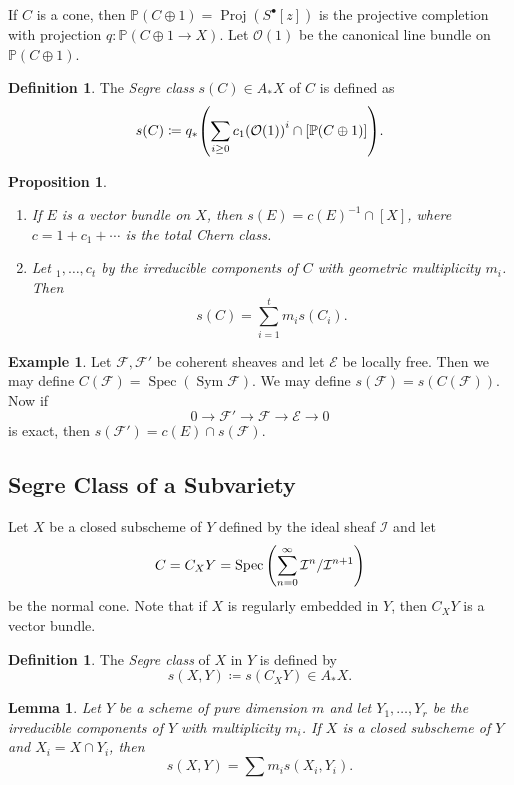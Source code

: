 \documentclass[leqno, openany]{memoir}
\newtheorem{prop}[thm]{Proposition}
\newtheorem{lem}[thm]{Lemma}
\theoremstyle{definition}
\newtheorem{defn}[thm]{Definition}
\newtheorem{exm}[thm]{Example}
\theoremstyle{remark}
\theoremstyle{plain}
\theoremstyle{definition}
\theoremstyle{remark}
\renewcommand{\P}{\mathbb{P}}
\newcommand{\mc}[1]{\mathcal{#1}}
\DeclareMathOperator{\Spec}{Spec}
\DeclareMathOperator{\Proj}{Proj}
\begin{document}
If $C$ is a cone, then $\P(C \oplus 1) = \Proj (S^{\bullet}[z])$ is the
projective completion with projection $q \colon \P(C \oplus 1 \to X)$. Let
$\mc{O}(1)$ be the canonical line bundle on $\P(C \oplus 1)$.

\begin{defn} The \textit{Segre class} $s(C) \in A_* X$ of $C$ is defined as \[
s(C) \coloneqq q_* \qty( \sum_{i \geq 0} {c_1(\mc{O}(1))}^i \cap [\P(C \oplus
1)] ). \] \end{defn}

\begin{prop}\leavevmode \begin{enumerate} \item If $E$ is a vector bundle on
    $X$, then $s(E) = {c(E)}^{-1} \cap [X]$, where $c = 1 + c_1 + \cdots$ is
    the total Chern class.  \item Let $_1, \ldots, c_t$ by the irreducible
    components of $C$ with geometric multiplicity $m_i$. Then \[ s(C) = \sum_{i
= 1}^t m_i s(C_i). \] \end{enumerate} \end{prop}

\begin{exm} Let $\mc{F}, \mc{F'}$ be coherent sheaves and let $\mc{E}$ be
    locally free. Then we may define $C(\mc{F}) = \Spec ( \operatorname{Sym}
    \mc{F} )$. We may define $s(\mc{F}) = s(C(\mc{F}))$. Now if \[ 0 \to
    \mc{F}' \to \mc{F} \to \mc{E} \to 0 \] is exact, then $s(\mc{F'}) = c(E)
\cap s(\mc{F})$.  \end{exm}

\subsection{Segre Class of a Subvariety}%
\label{sub:segre_class_of_a_subvariety}

Let $X$ be a closed subscheme of $Y$ defined by the ideal sheaf $\mc{I}$ and
let \[ C = C_X Y = \Spec \qty( \sum_{n=0}^{\infty} \mc{I}^n / \mc{I}^{n+1} ) \]
be the normal cone. Note that if $X$ is regularly embedded in $Y$, then $C_X Y$
is a vector bundle.

\begin{defn} The \textit{Segre class} of $X$ in $Y$ is defined by \[ s(X,Y)
\coloneqq s(C_X Y) \in A_* X. \] \end{defn}

\begin{lem} Let $Y$ be a scheme of pure dimension $m$ and let $Y_1, \ldots,
    Y_r$ be the irreducible components of $Y$ with multiplicity $m_i$. If $X$
    is a closed subscheme of $Y$ and $X_i = X \cap Y_i$, then \[ s(X,Y) = \sum
    m_i s(X_i, Y_i). \] \end{lem}
\end{document}
